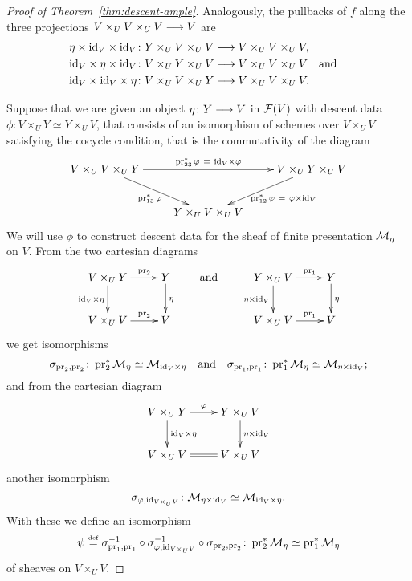 \begin{4   STACKS}
\begin{4.3 Descent for morphisms of schemes}
\begin{proof}[Proof of Theorem~\ref{thm:descent-ample}]
Analogously, the pullbacks of $f$ along the three projections $V \times_U V \times_U V \arr V$ are
   \begin{align*}
   \eta \times \id_V \times \id_V &\colon Y \times_U V \times_U V 
   \arr V \times_U V \times_U V, \\
   \id_V \times \eta \times \id_V &\colon
   V \times_U Y \times_U V \arr V \times_U V \times_U V
   \quad\text{and} \quad\\
   \id_V \times \id_V \times \eta &\colon
   V \times_U V \times_U Y \arr V \times_U V \times_U V.
   \end{align*}


Suppose that we are given an object $\eta\colon Y \arr V$ in $\mathcal{F}(V)$ with descent data $\phi \colon V \times_{U} Y \simeq Y \times_{U} V$, that consists of an isomorphism of schemes over $V \times_{U} V$ satisfying the cocycle condition, that is the commutativity of the diagram
   \[
   \xymatrix{
   V \times_{U} V \times_{U} Y
      \ar[rr]^-{\pr_{23}^{*}\phi \ =\ \id_{V}\times\phi}
      \ar[rd] _-{\pr_{13}^{*}\phi}
   && V \times_{U} Y \times_{U} V
      \ar[ld]^-{\hskip10pt\pr_{12}^{*}\phi\ =\ \phi\times\id_{V}}
   \\
   & Y\times_{U} V \times_{U} V
   }
   \]
We will use $\phi$ to construct descent data for the \qc sheaf of finite presentation $\mathcal{M}_{\eta}$ on $V$.
From the two cartesian diagrams
   \[
   \xymatrix{
   V \times_U Y\ar[r]^-{\pr_2} \ar[d]_{\id_V \times \eta}
   & Y \ar[d]^\eta
   \\
   V \times_U V \ar[r]^-{\pr_2} & V
   }
   \qquad \text{and} \qquad
   \xymatrix{
   Y \times_U V \ar[r]^-{\pr_1} \ar[d]_{\eta \times \id_V}
   & Y \ar[d]^\eta
   \\
   V \times_U V \ar[r]^-{\pr_1}    & V
   }
   \]
we get isomorphisms
   \[
   \sigma_{\operatorname{pr}_{2},\operatorname{pr}_{2}} \colon
      \operatorname{pr}_{2}^{*}\mathcal{M}_{\eta} \simeq \mathcal{M}_{\mathrm{id}_V \times \eta}
   \quad
   \text{and}
   \quad
   \sigma_{\operatorname{pr}_{1},\operatorname{pr}_{1}} \colon
      \operatorname{pr}_{1}^{*}\mathcal{M}_{\eta} \simeq \mathcal{M}_{\eta\times\mathrm{id}_V};
   \]
and from the cartesian diagram
   \[
   \xymatrix{
   V\times_{U} Y \ar[r]^-{\phi} \ar[d]^{\id_{V}\times\eta}
   & Y\times_{U} V \ar[d]^{\eta\times \id_{V}}
   \\
   V\times_{U} V \ar@{=}[r]
   &V\times_{U} V
   }
   \]
another isomorphism
   \[
   \sigma_{\varphi,\mathrm{id}_{V\times_{U}V}}\colon \mathcal{M}_{\eta\times\mathrm{id}_V} 
      \simeq \mathcal{M}_{\mathrm{id}_V \times \eta}.
   \]
With these we define an isomorphism
   \[
   \psi \overset{\mathrm{\scriptscriptstyle def}} = \sigma_{\operatorname{pr}_{1},\operatorname{pr}_{1}}^{-1} \circ
      \sigma_{\varphi,\mathrm{id}_{V\times_{U}V}}^{-1} \circ
      \sigma_{\operatorname{pr}_{2},\operatorname{pr}_{2}}\colon 
      \operatorname{pr}_{2}^{*}\mathcal{M}_{\eta} \simeq \operatorname{pr}_{1}^{*}\mathcal{M}_{\eta}
   \]
of \qc sheaves on $V \times_{U} V$.


\end{proof}
\end{4.3 Descent for morphisms of schemes}
\end{4   STACKS}
